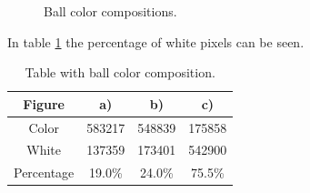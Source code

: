 \begin{figure}[H]
\centering
{}

\caption{Ball color compositions.}
\label{fig:ballscompo}
\end{figure}

In table \ref{fig:ballscompotable} the percentage of white pixels can be seen.\\


\begin{table}[H]
\centering
\begin{tabular}{|c|c|c|c|}
	\hline Figure & a) & b) & c) \\ 
	\hline Color & 583217 & 548839 & 175858 \\ 
	\hline White & 137359 & 173401 & 542900 \\ 
	\hline Percentage & 19.0\% & 24.0\% & 75.5\% \\ 
	\hline
\end{tabular}
\caption{Table with ball color composition.}
\label{fig:ballscompotable}
\end{table}

